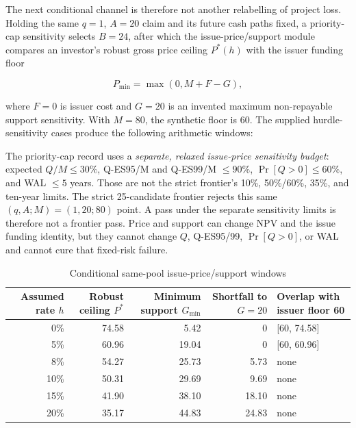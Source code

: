\documentclass[11pt,a4paper]{article}
\begin{document}
The next conditional channel is therefore not another relabelling of project loss. Holding the same \(q=1\), \(A=20\) claim and its future cash paths fixed, a priority-cap sensitivity selects \(B=24\), after which the issue-price/support module compares an investor's robust gross price ceiling \(P^*(h)\) with the issuer funding floor

\[
P_{\min}=\max(0,M+F-G),
\]

where \(F=0\) is issuer cost and \(G=20\) is an invented maximum non-repayable support sensitivity. With \(M=80\), the synthetic floor is 60. The supplied hurdle-sensitivity cases produce the following arithmetic windows:

The priority-cap record uses a \emph{separate, relaxed issue-price sensitivity budget}: expected \(Q/M\leq30\%\), Q-ES95/M and Q-ES99/M \(\leq90\%\), \(\Pr[Q>0]\leq60\%\), and WAL \(\leq5\) years. Those are not the strict frontier's 10\%, 50\%/60\%, 35\%, and ten-year limits. The strict 25-candidate frontier rejects this same \((q,A;M)=(1,20;80)\) point. A pass under the separate sensitivity limits is therefore not a frontier pass. Price and support can change NPV and the issue funding identity, but they cannot change \(Q\), Q-ES95/99, \(\Pr[Q>0]\), or WAL and cannot cure that fixed-risk failure.

\begin{table}[htbp]
\centering
\caption{Conditional same-pool issue-price/support windows}
\label{tab:pricewindows}
\scriptsize
\begin{tabularx}{\textwidth}{@{}R R R R Y@{}}
\toprule
\textbf{Assumed rate \(h\)} & \textbf{Robust ceiling \(P^*\)} & \textbf{Minimum support \(G_{\min}\)} & \textbf{Shortfall to \(G=20\)} & \textbf{Overlap with issuer floor 60} \\
\% & 74.58 & 5.42 & 0 & [60, 74.58] \\
5\% & 60.96 & 19.04 & 0 & [60, 60.96] \\
8\% & 54.27 & 25.73 & 5.73 & none \\
10\% & 50.31 & 29.69 & 9.69 & none \\
15\% & 41.90 & 38.10 & 18.10 & none \\
20\% & 35.17 & 44.83 & 24.83 & none \\
\bottomrule
\end{tabularx}
\end{table}
\end{document}
